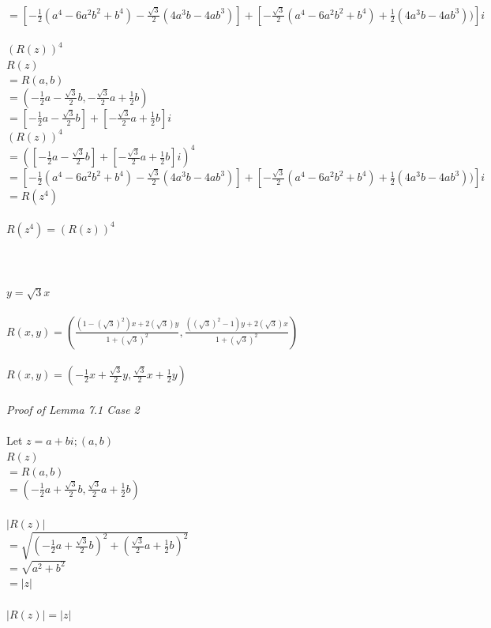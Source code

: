 \documentclass{article}
\begin{document}
\\$= [-\frac{1}{2}(a^4-6a^2b^2+b^4)-\frac{\sqrt{3}}{2}(4a^3b-4ab^3)] + [-\frac{\sqrt{3}}{2}(a^4-6a^2b^2+b^4)+\frac{1}{2}(4a^3b-4ab^3))]i$
\\
\\$(R(z))^4$
\\$R(z)$
\\$= R(a,b)$
\\$= (-\frac{1}{2}a-\frac{\sqrt{3}}{2}b, -\frac{\sqrt{3}}{2}a+\frac{1}{2}b)$
\\$= [-\frac{1}{2}a-\frac{\sqrt{3}}{2}b] + [-\frac{\sqrt{3}}{2}a+\frac{1}{2}b]i$
\\$(R(z))^4$
\\$= ([-\frac{1}{2}a-\frac{\sqrt{3}}{2}b] + [-\frac{\sqrt{3}}{2}a+\frac{1}{2}b]i)^4$
\\$= [-\frac{1}{2}(a^4-6a^2b^2+b^4)-\frac{\sqrt{3}}{2}(4a^3b-4ab^3)] + [-\frac{\sqrt{3}}{2}(a^4-6a^2b^2+b^4)+\frac{1}{2}(4a^3b-4ab^3))]i$
\\$= R(z^4)$
\\
\\$R(z^4) = (R(z))^4$
\\
\\
\\
\\
\underline{$y=\sqrt{3}x$}           %
\\
\\
$R(x,y) = (\frac{(1-(\sqrt{3})^2)x+2(\sqrt{3})y}{1+(\sqrt{3})^2}, \frac{((\sqrt{3})^2-1)y+2(\sqrt{3})x}{1+(\sqrt{3})^2})$
\\
\\$R(x,y) = (-\frac{1}{2}x+\frac{\sqrt{3}}{2}y, \frac{\sqrt{3}}{2}x+\frac{1}{2}y)$
\\
\\\textit{Proof of Lemma 7.1 Case 2}
\\
\\Let $z=a+bi; (a,b)$
\\$R(z)$
\\$= R(a,b)$
\\$= (-\frac{1}{2}a+\frac{\sqrt{3}}{2}b, \frac{\sqrt{3}}{2}a+\frac{1}{2}b)$
\\
\\$|R(z)|$
\\$= \sqrt{(-\frac{1}{2}a+\frac{\sqrt{3}}{2}b)^2 + (\frac{\sqrt{3}}{2}a+\frac{1}{2}b)^2}$
\\$= \sqrt{a^2 + b^2}$
\\$= |z|$
\\
\\$|R(z)| = |z|$
\end{document}
